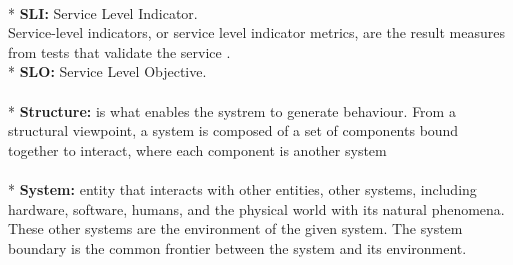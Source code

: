 \documentclass[english]{tktltiki2}
\theoremstyle{definition}
\theoremstyle{remark}
\begin{document}
\\*
\textbf{SLI:} Service Level Indicator.\\
Service-level indicators, or service level indicator metrics, are the result measures from tests that validate the service \cite{AAMES} .
\\*
\textbf{SLO:} Service Level Objective.\\
\\*
\textbf{Structure:} is what enables the systrem to generate behaviour. From a structural viewpoint, a system is composed of a set of components bound
together to interact, where each component is another system\\
\\*
\textbf{System:} entity that interacts with other entities, other systems, including hardware, software, humans, and the physical world with its natural phenomena. These other systems are the environment of the given system. The system boundary is the common frontier between the system and its environment.\\
\pagebreak
\end{document}
